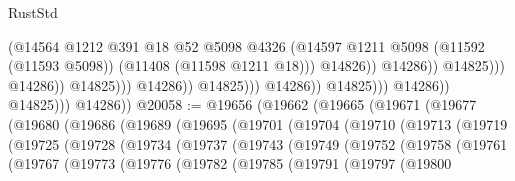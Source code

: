 \begin{lexlean}{RustStd}
\begin{coremodule}
                                                            (@14564
                                                              @1212
                                                              @391
                                                              @18
                                                              @52
                                                              @5098
                                                              @4326
                                                              (@14597
                                                                @1211
                                                                @5098
                                                                (@11592 (@11593 @5098))
                                                                (@11408 (@11598 @1211 @18)))
                                                              @14826))
                                                          @14286))
                                                      @14825)))
                                                @14286))
                                            @14825)))
                                      @14286))
                                  @14825)))
                            @14286))
                        @14825)))
                  @14286))
              @14825)))
        @14286))
@20058 := @19656
    (@19662
      (@19665
        (@19671
          (@19677
            (@19680
              (@19686
                (@19689
                  (@19695
                    (@19701
                      (@19704
                        (@19710
                          (@19713
                            (@19719
                              (@19725
                                (@19728
                                  (@19734
                                    (@19737
                                      (@19743
                                        (@19749
                                          (@19752
                                            (@19758
                                              (@19761
                                                (@19767
                                                  (@19773
                                                    (@19776
                                                      (@19782
                                                        (@19785
                                                          (@19791
                                                            (@19797
                                                              (@19800

\end{coremodule}
\end{lexlean}
